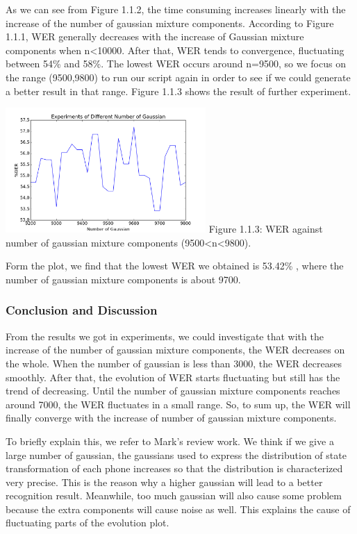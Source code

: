 \documentclass[]{article}
\begin{document}
\begin{multicols*}{2}
As we can see from Figure 1.1.2, the time consuming increases linearly with the increase of the number of gaussian mixture components.  According to Figure 1.1.1, WER generally decreases with the increase of Gaussian mixture components when n<10000. After that, WER tends to convergence, fluctuating between 54\% and 58\%. The lowest WER occurs around n=9500, so we focus on the range (9500,9800) to run our script again in order to see if we could generate a better result in that range. Figure 1.1.3 shows the result of further experiment.
\begin{center}
\includegraphics[width=3in]{result1_detailed_wer_new.png} 
Figure 1.1.3: WER against number of gaussian mixture components (9500<n<9800).
\end{center}
Form the plot, we find that the lowest WER we obtained is 53.42\%  , where the number of gaussian mixture components is about 9700.

\subsubsection{Conclusion and Discussion}
From the results we got in experiments, we could investigate that with the increase of the number of gaussian mixture components, the WER decreases on the whole. When the number of gaussian is less than 3000, the WER decreases smoothly. After that, the evolution of WER starts fluctuating but still has the trend of decreasing. Until the number of gaussian mixture components reaches around 7000, the WER fluctuates in a small range. So, to sum up, the WER will finally converge with the increase of number of gaussian mixture components.

To briefly explain this, we refer to Mark's review work. We think if we give a large number of gaussian, the gaussians used to express the distribution of state transformation of each phone increases so that the distribution is characterized very precise. This is the reason why a higher gaussian will lead to a better recognition result. Meanwhile, too much gaussian will also cause some problem because the extra components will cause noise as well. This explains the cause of fluctuating parts of the evolution plot.


\end{multicols*}
\end{document}

